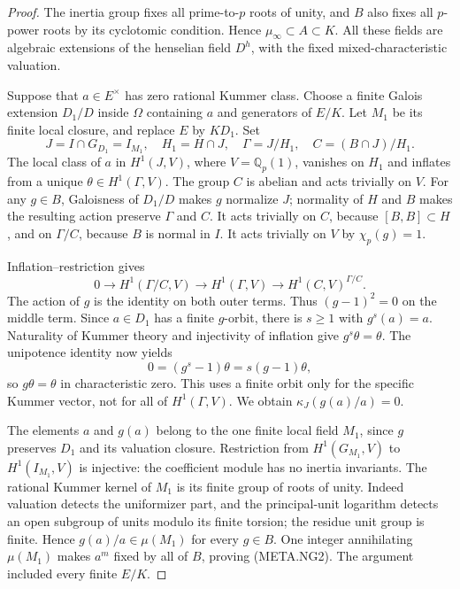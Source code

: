 \begin{proof}
The inertia group fixes all prime-to-$p$ roots
of unity, and $B$ also fixes all $p$-power roots
by its cyclotomic condition.  Hence
$\mu_\infty\subset A\subset K$.
All these fields are algebraic extensions of
the henselian field $D^h$, with the fixed
mixed-characteristic valuation.

Suppose that $a\in E^\times$ has zero rational
Kummer class.  Choose a finite Galois extension
$D_1/D$ inside $\Omega$ containing $a$ and
generators of $E/K$.  Let $M_1$ be its finite
local closure, and replace $E$ by $KD_1$.
Set
\[
 J=I\cap G_{D_1}=I_{M_1},\quad H_1=H\cap J,
 \quad\Gamma=J/H_1,\quad C=(B\cap J)/H_1.
\]
The local class of $a$ in $H^1(J,V)$, where
$V=\mathbb Q_p(1)$, vanishes on $H_1$ and
inflates from a unique $\theta\in H^1(\Gamma,V)$.
The group $C$ is abelian and acts trivially on $V$.
For any $g\in B$, Galoisness of $D_1/D$ makes
$g$ normalize $J$; normality of $H$ and $B$
makes the resulting action preserve $\Gamma$
and $C$.
It acts trivially on $C$, because $[B,B]\subset H$,
and on $\Gamma/C$, because $B$ is normal in $I$.
It acts trivially on $V$ by $\chi_p(g)=1$.

Inflation--restriction gives
\[
 0\longrightarrow H^1(\Gamma/C,V)
 \longrightarrow H^1(\Gamma,V)
 \longrightarrow H^1(C,V)^{\Gamma/C}.
                                                        \tag{META.NG3}
\]
The action of $g$ is the identity on both outer
terms.  Thus $(g-1)^2=0$ on the middle term.
Since $a\in D_1$ has a finite $g$-orbit, there
is $s\ge1$ with $g^s(a)=a$.
Naturality of Kummer theory and injectivity of
inflation give $g^s\theta=\theta$.
The unipotence identity now yields
\[
               0=(g^s-1)\theta=s(g-1)\theta,
\]
so $g\theta=\theta$ in characteristic zero.
This uses a finite orbit only for the specific
Kummer vector, not for all of $H^1(\Gamma,V)$.
We obtain $\kappa_J(g(a)/a)=0$.

The elements $a$ and $g(a)$ belong to the one
finite local field $M_1$, since $g$ preserves
$D_1$ and its valuation closure.
Restriction from $H^1(G_{M_1},V)$ to
$H^1(I_{M_1},V)$ is injective: the coefficient
module has no inertia invariants.
The rational Kummer kernel of $M_1$ is its
finite group of roots of unity.
Indeed valuation detects the uniformizer part,
and the principal-unit logarithm detects an
open subgroup of units modulo its finite
torsion; the residue unit group is finite.
Hence $g(a)/a\in\mu(M_1)$ for every $g\in B$.
One integer annihilating $\mu(M_1)$ makes
$a^m$ fixed by all of $B$, proving (META.NG2).
The argument included every finite $E/K$.


\end{proof}
